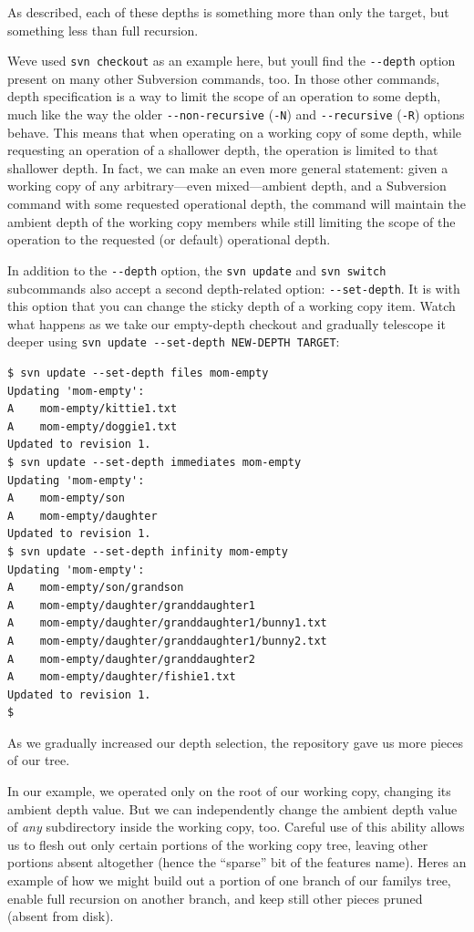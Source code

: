 As described, each of these depths is something more than only the
target, but something less than full recursion.

We\textquotesingle ve used \texttt{svn\ checkout} as an example here,
but you\textquotesingle ll find the \texttt{-\/-depth} option present on
many other Subversion commands, too. In those other commands, depth
specification is a way to limit the scope of an operation to some depth,
much like the way the older \texttt{-\/-non-recursive} (\texttt{-N}) and
\texttt{-\/-recursive} (\texttt{-R}) options behave. This means that
when operating on a working copy of some depth, while requesting an
operation of a shallower depth, the operation is limited to that
shallower depth. In fact, we can make an even more general statement:
given a working copy of any arbitrary---even mixed---ambient depth, and
a Subversion command with some requested operational depth, the command
will maintain the ambient depth of the working copy members while still
limiting the scope of the operation to the requested (or default)
operational depth.

In addition to the \texttt{-\/-depth} option, the \texttt{svn\ update}
and \texttt{svn\ switch} subcommands also accept a second depth-related
option: \texttt{-\/-set-depth}. It is with this option that you can
change the sticky depth of a working copy item. Watch what happens as we
take our empty-depth checkout and gradually telescope it deeper using
\texttt{svn\ update\ -\/-set-depth\ NEW-DEPTH\ TARGET}:

\begin{verbatim}
$ svn update --set-depth files mom-empty
Updating 'mom-empty':
A    mom-empty/kittie1.txt
A    mom-empty/doggie1.txt
Updated to revision 1.
$ svn update --set-depth immediates mom-empty
Updating 'mom-empty':
A    mom-empty/son
A    mom-empty/daughter
Updated to revision 1.
$ svn update --set-depth infinity mom-empty
Updating 'mom-empty':
A    mom-empty/son/grandson
A    mom-empty/daughter/granddaughter1
A    mom-empty/daughter/granddaughter1/bunny1.txt
A    mom-empty/daughter/granddaughter1/bunny2.txt
A    mom-empty/daughter/granddaughter2
A    mom-empty/daughter/fishie1.txt
Updated to revision 1.
$
\end{verbatim}

As we gradually increased our depth selection, the repository gave us
more pieces of our tree.

In our example, we operated only on the root of our working copy,
changing its ambient depth value. But we can independently change the
ambient depth value of \emph{any} subdirectory inside the working copy,
too. Careful use of this ability allows us to flesh out only certain
portions of the working copy tree, leaving other portions absent
altogether (hence the ``sparse'' bit of the feature\textquotesingle s
name). Here\textquotesingle s an example of how we might build out a
portion of one branch of our family\textquotesingle s tree, enable full
recursion on another branch, and keep still other pieces pruned (absent
from disk).

